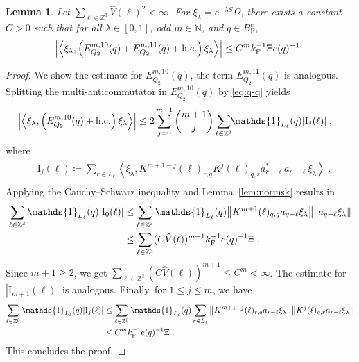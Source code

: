 \documentclass[12pt,a4paper]{article}
\numberwithin{equation}{section}
\newcommand{\NNN}{\mathbb{N}}
\newcommand{\1}{\mathbb{I}}
\newcommand{\F}{\mathrm{F}}
\newcommand{\I}{\mathrm{I}}
\newcommand{\kF}{k_\F}
\newcommand{\Zstar}{\mathbb{Z}^3} %
\newcommand{\Z}{\mathbb{Z}}
\newcommand{\eva}[1]{\left\langle #1 \right\rangle}
\theoremstyle{plain}
\newtheorem{lemma}[theorem]{Lemma}
\theoremstyle{definition}
\theoremstyle{remark}
\theoremstyle{plain}
\theoremstyle{definition}
\theoremstyle{remark}
\begin{document}
\begin{lemma} \label{lem:EQ212}
Let $ \sum_{\ell \in \Zstar} \hat{V}(\ell)^2 < \infty $. For $\xi_\lambda = e^{-\lambda S} \Omega$, there exists a constant $ C > 0 $ such that for all $ \lambda \in [0,1] $, odd $ m \in \NNN $, and $ q \in B_{\F}^c $,
\begin{equation}
	\abs{\eva{\xi_\lambda,\left(E^{m,10}_{Q_2}(q) + E^{m,11}_{Q_2}(q) + \mathrm{h.c.}\right) \xi_\lambda }}
	\leq C^m \kF^{-1} \Xi e(q)^{-1} \;. \label{eq:estEQ212}
\end{equation}
\end{lemma}

\begin{proof}
We show the estimate for $ E^{m,10}_{Q_2}(q) $, the term $ E^{m,11}_{Q_2}(q) $ is analogous.
Splitting the multi-anticommutator in $ E^{m,10}_{Q_2}(q) $ by \eqref{eq:q-q} yields
\begin{equation} \label{eq:EQ2121}
\begin{aligned}
	& \abs{\eva{\xi_\lambda,\left(E^{m,10}_{Q_2}(q) + \mathrm{h.c.}\right) \xi_\lambda }}
	\le 2 \sum_{j=0}^{m+1} {{m+1}\choose j} \sum_{\ell \in \Zstar}\!\! \mathds{1}_{L_\ell}(q) |\I_j(\ell)| \;,
\end{aligned}
\end{equation}
where
\begin{equation}
\begin{aligned}
	& \I_j(\ell)
	\coloneq \sum_{r\in L_{\ell}}
		\eva{\xi_\lambda, K^{m+1-j}(\ell)_{r,q} K^{j}(\ell)_{q,r} a^*_{r-\ell} a_{r-\ell} \xi_\lambda} \;. \\
\end{aligned}
\end{equation}
Applying the Cauchy--Schwarz inequality and Lemma~\ref{lem:normsk} results in
\begin{equation}
\begin{split}
	\sum_{\ell \in \Zstar} \mathds{1}_{L_\ell}(q) |\I_0(\ell)|
	& \leq \sum_{\ell \in \Zstar} \mathds{1}_{L_\ell}(q) \norm{ K^{m+1}(\ell)_{q,q} a_{q-\ell} \xi_\lambda}\norm{ a_{q-\ell} \xi_\lambda } \\
&	\leq \sum_{\ell \in \Zstar} (C \hat{V}(\ell))^{m+1}
		\kF^{-1} e(q)^{-1} \Xi \;.
\end{split}
		\label{eq:estEQ2121}
\end{equation}
Since $ m+1 \ge 2 $, we get $ \sum_{\ell \in \Zstar} (C \hat{V}(\ell))^{m+1} \le C^m < \infty $. The estimate for $ |\I_{m+1}(\ell)| $ is analogous. Finally, for $ 1 \le j \le m $, we have
\begin{equation}
\begin{split}
	\sum_{\ell \in \Zstar} \mathds{1}_{L_\ell}(q) |\I_j(\ell)|
	& \leq \sum_{\ell \in \Zstar} \mathds{1}_{L_\ell}(q)
		\sum\limits_{r \in L_{\ell}}
		\norm{ K^{m+1-j}(\ell)_{r,q} a_{r-\ell}\xi_\lambda}
		\norm{ K^j(\ell)_{q,r} a_{r-\ell} \xi_\lambda } \\
&	\leq C^m \kF^{-1} e(q)^{-1} \Xi \;.
	\end{split}
	\label{eq:estEQ2122}
\end{equation}
This concludes the proof.
\end{proof}
\end{document}
